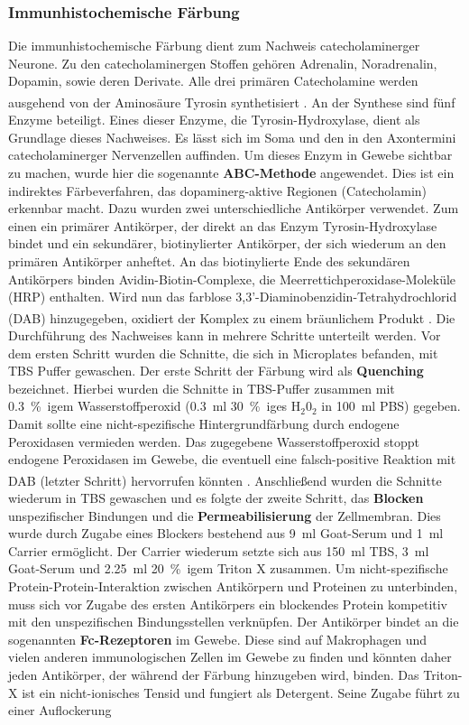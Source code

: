 \subsubsection{Immunhistochemische Färbung}

Die immunhistochemische Färbung dient zum Nachweis catecholaminerger Neurone. Zu den catecholaminergen Stoffen gehören Adrenalin, Noradrenalin, Dopamin, sowie deren Derivate. Alle drei primären Catecholamine werden ausgehend von der Aminosäure Tyrosin synthetisiert \textsuperscript{\cite[Kap.~13]{kandel2013principles}}. An der Synthese sind fünf Enzyme beteiligt. Eines dieser Enzyme, die Tyrosin-Hydroxylase, dient als Grundlage dieses Nachweises. Es lässt sich im Soma und den in den Axontermini catecholaminerger Nervenzellen auffinden. Um dieses Enzym in Gewebe sichtbar zu machen, wurde hier die sogenannte \textbf{ABC-Methode} angewendet. Dies ist ein indirektes Färbeverfahren, das dopaminerg-aktive Regionen (Catecholamin) erkennbar macht. Dazu wurden zwei unterschiedliche Antikörper verwendet. Zum einen ein primärer Antikörper, der direkt an das Enzym Tyrosin-Hydroxylase bindet und ein sekundärer, biotinylierter Antikörper, der sich wiederum an den primären Antikörper anheftet. An das biotinylierte Ende des sekundären Antikörpers binden Avidin-Biotin-Complexe, die Meerrettichperoxidase-Moleküle (HRP) enthalten. Wird nun das farblose 3,3'-Diaminobenzidin-Tetrahydrochlorid (DAB) hinzugegeben, oxidiert der Komplex zu einem bräunlichem Produkt \textsuperscript{\cite{burry2009immunocytochemistry}}. Die Durchführung des Nachweises kann in mehrere Schritte unterteilt werden. Vor dem ersten Schritt wurden die Schnitte, die sich in Microplates befanden, mit TBS Puffer gewaschen. Der erste Schritt der Färbung wird als \textbf{Quenching} bezeichnet. Hierbei wurden die Schnitte in TBS-Puffer zusammen mit 0.3~\%~igem Wasserstoffperoxid (0.3~ml 30~\%~iges H$_{2}$0$_{2}$ in 100~ml PBS) gegeben. Damit sollte eine nicht-spezifische Hintergrundfärbung durch endogene Peroxidasen vermieden werden. Das zugegebene Wasserstoffperoxid stoppt endogene Peroxidasen im Gewebe, die eventuell eine falsch-positive Reaktion mit DAB (letzter Schritt) hervorrufen könnten \textsuperscript{\cite{burry2009immunocytochemistry}}. Anschließend wurden die Schnitte wiederum in TBS gewaschen und es folgte der zweite Schritt, das \textbf{Blocken} unspezifischer Bindungen und die \textbf{Permeabilisierung} der Zellmembran. Dies wurde durch Zugabe eines Blockers bestehend aus 9~ml Goat-Serum und 1~ml Carrier ermöglicht. Der Carrier wiederum setzte sich aus 150~ml TBS, 3~ml Goat-Serum und 2.25~ml 20~\%~igem Triton X zusammen. Um nicht-spezifische Protein-Protein-Interaktion zwischen Antikörpern und Proteinen zu unterbinden, muss sich vor Zugabe des ersten Antikörpers ein blockendes Protein kompetitiv mit den unspezifischen Bindungsstellen verknüpfen. Der Antikörper bindet an die sogenannten \textbf{Fc-Rezeptoren} im Gewebe. Diese sind auf Makrophagen und vielen anderen immunologischen Zellen im Gewebe zu finden und könnten daher jeden Antikörper, der während der Färbung hinzugeben wird, binden. Das Triton-X ist ein nicht-ionisches Tensid und fungiert als Detergent. Seine Zugabe führt zu einer Auflockerung 